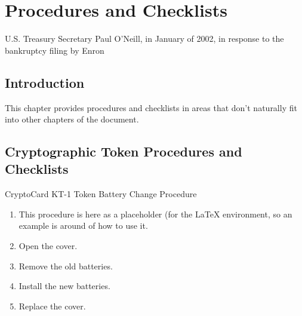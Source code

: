 
\chapter{Procedures and Checklists}

\label{cppc0}

                  {U.S. Treasury Secretary Paul O'Neill, in January of 2002, 
                   in response to the bankruptcy filing by Enron}

\section{Introduction}
\label{cppc0:sint0}

This chapter provides procedures and checklists in areas that don't
naturally fit into other chapters of the document.


\section{Cryptographic Token Procedures and Checklists}
\label{cppc0:sctk0}

\begin{procchklst}{CryptoCard KT-1 Token Battery Change Procedure}%
\label{proc:cppc0:sctk0:01}%
\begin{enumerate}
\item This procedure is here as a placeholder (for the \LaTeX{} environment, so
      an example is around of how to use it.
\item Open the cover.
\item Remove the old batteries.
\item Install the new batteries.
\item Replace the cover.
\end{enumerate}
\end{procchklst}
\procchklstfooter{}

